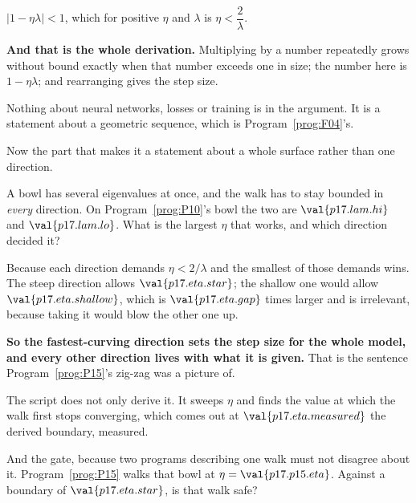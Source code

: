 \begin{fr}
\begin{ansblock}
$\lvert 1 - \eta\lambda \rvert < 1$, which for positive $\eta$ and $\lambda$
is $\eta < \dfrac{2}{\lambda}$.
\end{ansblock}

\textbf{And that is the whole derivation.} Multiplying by a number repeatedly
grows without bound exactly when that number exceeds one in size; the number
here is $1 - \eta\lambda$; and rearranging gives the step size.

Nothing about neural networks, losses or training is in the argument. It is a
statement about a geometric sequence, which is Program~\ref{prog:F04}'s.

\end{fr}

\begin{fr}
Now the part that makes it a statement about a whole surface rather than one
direction.

A bowl has several eigenvalues at once, and the walk has to stay bounded in
\emph{every} direction. On Program~\ref{prog:P10}'s bowl the two are
$\val{p17.lam.hi}$ and $\val{p17.lam.lo}$. What is the largest $\eta$ that
works, and which direction decided it?
\dotline
\nextframe
\end{fr}

\begin{fr}
Because each direction demands $\eta < 2/\lambda$ and the smallest of those
demands wins. The steep direction allows $\val{p17.eta.star}$; the shallow one
would allow $\val{p17.eta.shallow}$, which is $\val{p17.eta.gap}$ times
larger and is irrelevant, because taking it would blow the other one up.

\textbf{So the fastest-curving direction sets the step size for the whole
model, and every other direction lives with what it is given.} That is the
sentence Program~\ref{prog:P15}'s zig-zag was a picture of.

The script does not only derive it. It sweeps $\eta$ and finds the value at
which the walk first stops converging, which comes out at
$\val{p17.eta.measured}$ \dash{} the derived boundary, measured.
\end{fr}

\begin{fr}
And the gate, because two programs describing one walk must not disagree about
it. Program~\ref{prog:P15} walks that bowl at $\eta = \val{p17.p15.eta}$.
Against a boundary of $\val{p17.eta.star}$, is that walk safe?
\nextframe
\end{fr}

